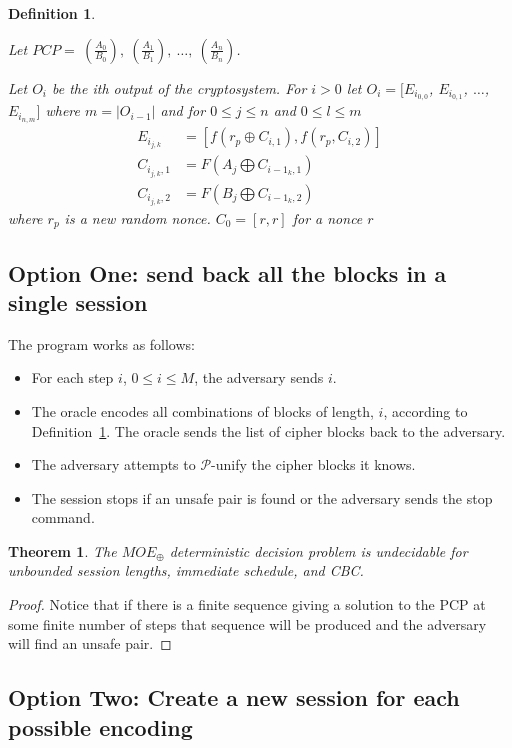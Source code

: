 \documentclass[11pt,twoside,a4paper]{article}
\newtheorem{definition}{Definition}
\newtheorem{theorem}{Theorem}
\begin{document}
\begin{definition}\label{det-func}
	
	Let $PCP = ~(\frac{A_0}{B_0}), ~(\frac{A_1}{B_1}), ~\ldots, ~(\frac{A_n}{B_n})$. 	
	
	Let $O_i$ be the ith output of the cryptosystem. 
	For $i > 0$ let $O_i = [E_{i_{0,0}}$, $E_{i_{0,1}}$, $\ldots$,
	$E_{i_{n,m}}]$ where $m = |O_{i-1}|$ and for 
	$0 \leq j \leq n$ and $0 \leq l \leq m$
	\begin{align*}
	E_{i_{j,k}} &= [f(r_p \oplus C_{i, 1}), f(r_p, C_{i,2}) ] \\
	C_{i_{j,k},1} &= F(A_j \bigoplus C_{i-1_{k}, 1})	\\
	C_{i_{j,k},2} &= F(B_j \bigoplus C_{i-1_{k}, 2}) 
	\end{align*}
	where $r_p$ is a new random nonce.
	$C_0 = [r,r]$ for a nonce $r$
\end{definition}

\subsection{Option One: send back all the blocks in a single session} 
The program works as follows:
\begin{itemize}
	\item For each step $i$, $0 \leq i \leq M$, the adversary
	sends $i$.
	\item The oracle encodes all combinations of blocks
	of length, $i$, according to Definition~\ref{det-func}.
	The oracle sends the list of cipher blocks back to
	the adversary.
	\item The adversary attempts to $\mathcal{P}$-unify
	the cipher blocks it knows.
	\item The session stops if an unsafe pair is found or 
	the adversary sends the stop command. 
\end{itemize}

\begin{theorem}
	The $MOE_{\oplus}$ deterministic decision problem is undecidable for unbounded session lengths, immediate schedule, and CBC.
\end{theorem}
\begin{proof}
	Notice that if there is a finite sequence giving a solution
	to the PCP at some finite number of steps that sequence will
	be produced and the adversary will find an unsafe pair.  
\end{proof}

\subsection{Option Two: Create a new session for each possible
	encoding}
\end{document}
